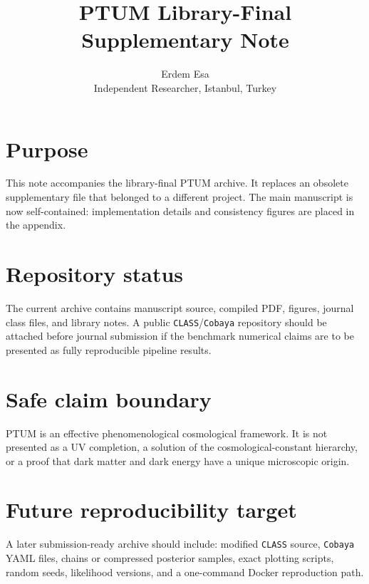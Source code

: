 \documentclass[11pt,a4paper]{article}
\title{PTUM Library-Final Supplementary Note}
\author{Erdem Esa\\Independent Researcher, Istanbul, Turkey}
\date{}
\begin{document}
\maketitle
\section*{Purpose}
This note accompanies the library-final PTUM archive. It replaces an obsolete supplementary file that belonged to a different project. The main manuscript is now self-contained: implementation details and consistency figures are placed in the appendix.
\section*{Repository status}
The current archive contains manuscript source, compiled PDF, figures, journal class files, and library notes. A public \texttt{CLASS}/\texttt{Cobaya} repository should be attached before journal submission if the benchmark numerical claims are to be presented as fully reproducible pipeline results.
\section*{Safe claim boundary}
PTUM is an effective phenomenological cosmological framework. It is not presented as a UV completion, a solution of the cosmological-constant hierarchy, or a proof that dark matter and dark energy have a unique microscopic origin.
\section*{Future reproducibility target}
A later submission-ready archive should include: modified \texttt{CLASS} source, \texttt{Cobaya} YAML files, chains or compressed posterior samples, exact plotting scripts, random seeds, likelihood versions, and a one-command Docker reproduction path.
\end{document}
